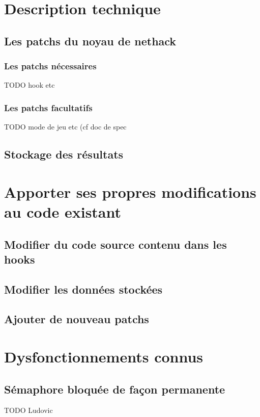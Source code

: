 \documentclass[10pt,a4paper]{report}
\begin{document}
\chapter{Description technique}
\section{Les patchs du noyau de nethack}
\subsection{Les patchs nécessaires}
TODO hook etc
\subsection{Les patchs facultatifs}
TODO mode de jeu etc (cf doc de spec
\section{Stockage des résultats}

\chapter{Apporter ses propres modifications au code existant}
\section{Modifier du code source contenu dans les hooks}
\section{Modifier les données stockées}
\section{Ajouter de nouveau patchs}

\chapter{Dysfonctionnements connus}
\section{Sémaphore bloquée de façon permanente}
TODO Ludovic
\end{document}
